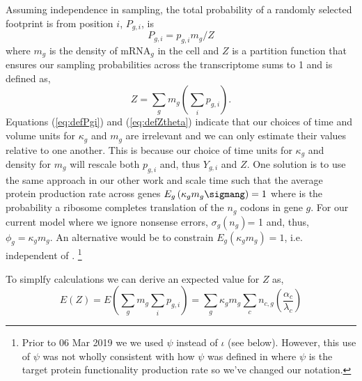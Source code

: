 \documentclass{article}
\newcommand{\sigmagng}{\ensuremath{\sigma_{g}(\ng)}\xspace}
\newcommand{\pgi}{\ensuremath{{p_{g,i}}}\xspace}
\newcommand{\Pgi}{\ensuremath{{P_{g,i}}}\xspace}
\renewcommand{\ng}{\ensuremath{{n_{g}}}\xspace}
\newcommand{\mg}{\ensuremath{{m_g}}\xspace}
\newcommand{\phig}{\ensuremath{{\phi_g}}\xspace}
\newcommand{\kappag}{\ensuremath{{\kappa_{g}}}\xspace}
\newcommand{\Ztheta}{\ensuremath{{Z}}\xspace}
\newcommand{\mRNAg}{mRNA$_g$\xspace}
\newcommand{\Ygi}{\ensuremath{{Y_{g,i}}}\xspace}
\begin{document}
Assuming independence in sampling, the total probability of a randomly selected footprint is from position $i$, $\Pgi$, is
\begin{equation} \label{eq:defPgi}
\Pgi = \pgi \mg/\Ztheta 
\end{equation}
where \mg is the density of \mRNAg in the cell and \Ztheta is a partition function that ensures our sampling probabilities across the transcriptome sums to 1 and is defined as,
\begin{equation}
  \label{eq:defZtheta}
  \Ztheta = \sum_g \mg \left(\sum_i \pgi\right).
\end{equation}
Equations (\ref{eq:defPgi}) and (\ref{eq:defZtheta}) indicate that our choices of time and volume units for \kappag and \mg are irrelevant and we can only estimate their values relative to one another.
This is because our choice of time units for $\kappag$ and density for $m_g$ will rescale both \pgi and, thus $\Ygi$ and $Z$.
One solution is to use the same approach in our other work and  scale time such that the average protein production rate across genes $E_g\left(\kappag \mg \sigmang\right) = 1$ where \sigmang is the probability a ribosome completes translation of the \ng codons in gene $g$.
For our current model where we ignore nonsense errors, \sigmagng = 1 and, thus, $\phig = \kappag \mg$.
An alternative would be to constrain $E_g\left(\kappag \mg\right) = 1$, i.e. independent of \sigmang.
\footnote{Prior to 06 Mar 2019 we we used $\psi$ instead of $\iota$ (see below).
  However, this use of $\psi$ was not wholly consistent with how $\psi$ was defined in \selac where $\psi$ is the  target protein functionality production rate so we've changed our notation.
  }
  
To simplfy calculations we can derive an expected value for $\Ztheta$ as,
\begin{equation}
 \label{eq:defExpZtheta}
 E(\Ztheta) = E(\sum_g m_g \sum_i p_{g,i}) = \sum_g \kappag \mg  \sum_c n_{c,g} (\frac{\alpha_c}{\lambda_c})
\end{equation}

\end{document}
